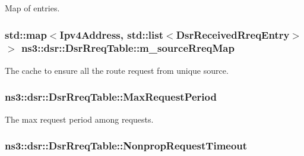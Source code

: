Map of entries. 

\subsubsection[{\texorpdfstring{m\+\_\+source\+Rreq\+Map}{m_sourceRreqMap}}]{\setlength{\rightskip}{0pt plus 5cm}std\+::map$<${\bf Ipv4\+Address}, {\bf std\+::list}$<${\bf Dsr\+Received\+Rreq\+Entry}$>$ $>$ ns3\+::dsr\+::\+Dsr\+Rreq\+Table\+::m\+\_\+source\+Rreq\+Map\hspace{0.3cm}{\ttfamily [private]}}\hypertarget{classns3_1_1dsr_1_1DsrRreqTable_a27e14271b4bc6fb6d8cbd294f6a97bfb}{}\label{classns3_1_1dsr_1_1DsrRreqTable_a27e14271b4bc6fb6d8cbd294f6a97bfb}


The cache to ensure all the route request from unique source. 

\subsubsection[{\texorpdfstring{Max\+Request\+Period}{MaxRequestPeriod}}]{ ns3\+::dsr\+::\+Dsr\+Rreq\+Table\+::\+Max\+Request\+Period\hspace{0.3cm}{\ttfamily [private]}}\hypertarget{classns3_1_1dsr_1_1DsrRreqTable_a3fbde93274fc9df61927bc78f444ef8f}{}\label{classns3_1_1dsr_1_1DsrRreqTable_a3fbde93274fc9df61927bc78f444ef8f}


The max request period among requests. 

\subsubsection[{\texorpdfstring{Nonprop\+Request\+Timeout}{NonpropRequestTimeout}}]{ ns3\+::dsr\+::\+Dsr\+Rreq\+Table\+::\+Nonprop\+Request\+Timeout\hspace{0.3cm}{\ttfamily [private]}}\hypertarget{classns3_1_1dsr_1_1DsrRreqTable_a10b2143f760b262b8328608cf592910a}{}\label{classns3_1_1dsr_1_1DsrRreqTable_a10b2143f760b262b8328608cf592910a}


